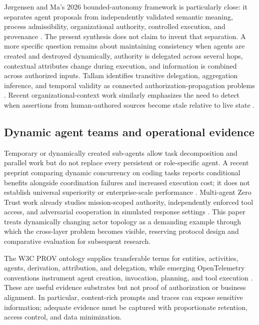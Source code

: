 \documentclass[11pt,letterpaper]{article}
\newcommand{\parencite}[1]{\citep{#1}}
\begin{document}
J{\o}rgensen and Ma's 2026 bounded-autonomy framework is particularly close: it separates agent proposals from independently validated semantic meaning, process admissibility, organizational authority, controlled execution, and provenance \parencite{jorgensen2026governing}. The present synthesis does not claim to invent that separation. A more specific question remains about maintaining consistency when agents are created and destroyed dynamically, authority is delegated across several hops, contextual attributes change during execution, and information is combined across authorized inputs. Tallam identifies transitive delegation, aggregation inference, and temporal validity as connected authorization-propagation problems \parencite{tallam2026authorization}. Recent organizational-context work similarly emphasizes the need to detect when assertions from human-authored sources become stale relative to live state \parencite{yavin2026context}.

\subsection{Dynamic agent teams and operational evidence}
Temporary or dynamically created sub-agents allow task decomposition and parallel work but do not replace every persistent or role-specific agent. A recent preprint comparing dynamic concurrency on coding tasks reports conditional benefits alongside coordination failures and increased execution cost; it does not establish universal superiority or enterprise-scale performance \parencite{li2026subagents}. Multi-agent Zero Trust work already studies mission-scoped authority, independently enforced tool access, and adversarial cooperation in simulated response settings \parencite{chen2026swarmgov}. This paper treats dynamically changing actor topology as a demanding example through which the cross-layer problem becomes visible, reserving protocol design and comparative evaluation for subsequent research.

The W3C PROV ontology supplies transferable terms for entities, activities, agents, derivation, attribution, and delegation, while emerging OpenTelemetry conventions instrument agent creation, invocation, planning, and tool execution \parencite{w3c2013prov,otel2026agent}. These are useful evidence substrates but not proof of authorization or business alignment. In particular, content-rich prompts and traces can expose sensitive information; adequate evidence must be captured with proportionate retention, access control, and data minimization.
\end{document}
